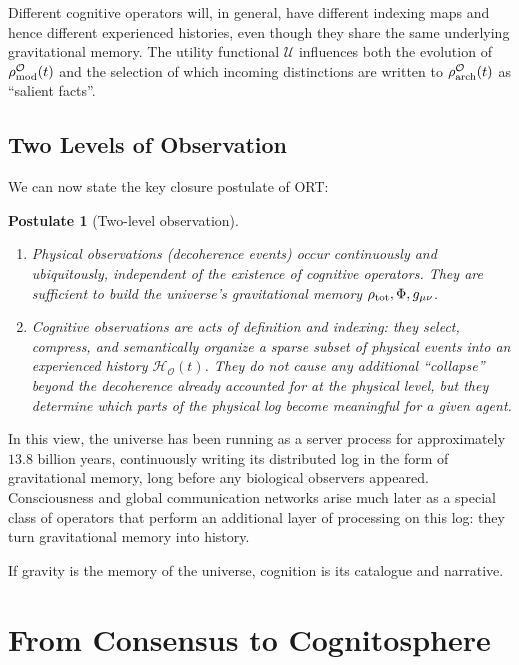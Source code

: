\documentclass[12pt,a4paper]{article}
\newtheorem{postulate}{Postulate}
\begin{document}
Different cognitive operators will, in general, have different indexing maps and hence different experienced histories, even though they share the same underlying gravitational memory. The utility functional $\mathcal{U}$ influences both the evolution of $\rho_{\rm mod}^{\mathcal{O}}(t)$ and the selection of which incoming distinctions are written to $\rho_{\rm arch}^{\mathcal{O}}(t)$ as ``salient facts''.

\subsection{Two Levels of Observation}
\label{subsec:two_levels}

We can now state the key closure postulate of ORT:

\begin{postulate}[Two-level observation]
\label{post:two_levels}
\begin{enumerate}
  \item Physical observations (decoherence events) occur continuously and ubiquitously, independent of the existence of cognitive operators. They are sufficient to build the universe's gravitational memory $\rho_{\rm tot}, \Phi, g_{\mu\nu}$.
  \item Cognitive observations are acts of definition and indexing: they select, compress, and semantically organize a sparse subset of physical events into an experienced history $\mathcal{H}_{\mathcal{O}}(t)$. They do not cause any additional ``collapse'' beyond the decoherence already accounted for at the physical level, but they determine which parts of the physical log become meaningful for a given agent.
\end{enumerate}
\end{postulate}

In this view, the universe has been running as a server process for approximately $13.8$ billion years, continuously writing its distributed log in the form of gravitational memory, long before any biological observers appeared. Consciousness and global communication networks arise much later as a special class of operators that perform an additional layer of processing on this log: they turn gravitational memory into history.

If gravity is the memory of the universe, cognition is its catalogue and narrative.

\section{From Consensus to Cognitosphere}
\label{sec:cognitosphere}
\end{document}
